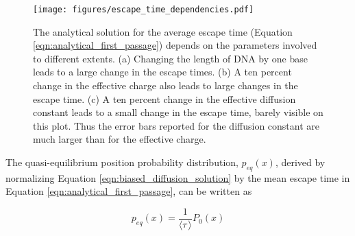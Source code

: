 \begin{figure}[h]
\begin{centering}
\texttt{[image: figures/escape\_time\_dependencies.pdf]}
\caption[Escape time depends on DNA length, charge, and diffusion constant]{The analytical solution for the average escape time (Equation \ref{eqn:analytical_first_passage}) depends on the parameters involved to different extents.  (a) Changing the length of DNA by one base leads to a large change in the escape times.  (b) A ten percent change in the effective charge also leads to large changes in the escape time.  (c) A ten percent change in the effective diffusion constant leads to a small change in the escape time, barely visible on this plot.  Thus the error bars reported for the diffusion constant are much larger than for the effective charge.}
\label{fig:escape_time_dependencies}
\end{centering}
\end{figure}

The quasi-equilibrium position probability distribution, $p_{eq}(x)$, derived by normalizing Equation \ref{eqn:biased_diffusion_solution} by the mean escape time in Equation \ref{eqn:analytical_first_passage}, can be written as

\begin{equation}
p_{eq}(x) = \frac{1}{\langle \tau \, \rangle} P_0(x)
\label{eqn:biased_diffusion_equilibrium}
\end{equation}
